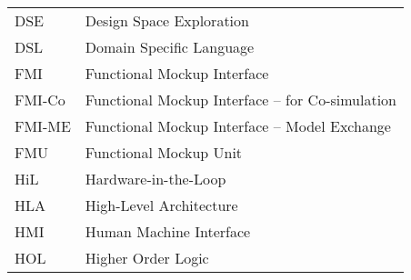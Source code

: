 \begin{longtable}{ll}
DSE	&Design Space Exploration\\
DSL & Domain Specific Language \\
FMI     &Functional Mockup Interface\\
FMI-Co  &Functional Mockup Interface -- for Co-simulation\\
FMI-ME  &Functional Mockup Interface -- Model Exchange\\
FMU     &Functional Mockup Unit\\
HiL	&Hardware-in-the-Loop\\
HLA & High-Level Architecture \\
HMI     &Human Machine Interface\\
HOL & Higher Order Logic\\

\end{longtable}
